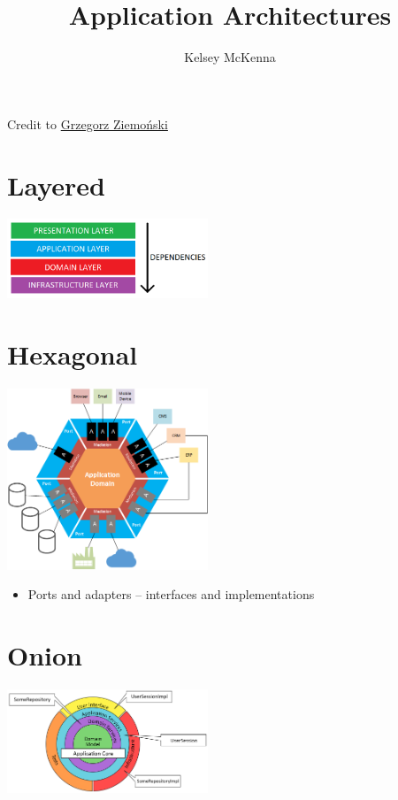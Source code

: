 \documentclass[10pt, twocolumn]{article}
\title{\vspace{-4cm}Application Architectures}
\author{Kelsey McKenna}
\date{}
\begin{document}
\maketitle

Credit to \href{https://dzone.com/articles/onion-architecture-is-interesting}{Grzegorz Ziemoński}

\section*{Layered}

\begin{center}
\includegraphics[width=0.45\textwidth]{layered-architecture-overview.png}
\end{center}

\section*{Hexagonal}

\begin{center}
\includegraphics[width=0.45\textwidth]{hexagonal.png}
\end{center}


\begin{itemize}
    \item Ports and adapters -- interfaces and implementations
\end{itemize}

\section*{Onion}

\begin{center}
\includegraphics[width=0.45\textwidth]{onion.png}
\end{center}
\end{document}
